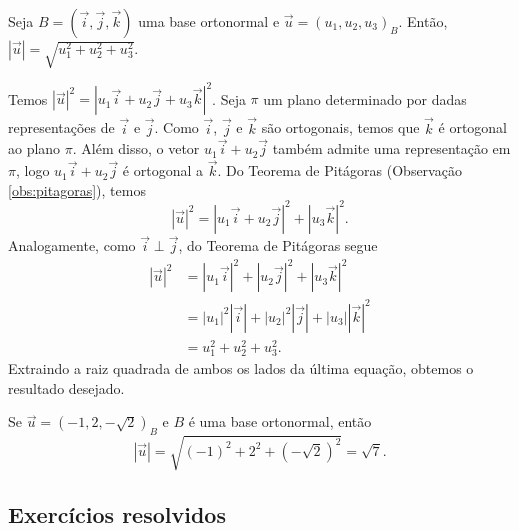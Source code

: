 \begin{prop}\label{prop:bo_norma}
  Seja $B = (\vec{i},\vec{j},\vec{k})$ uma base ortonormal e $\vec{u}=(u_1,u_2,u_3)_B$. Então, $|\vec{u}|=\sqrt{u_1^2+u_2^2+u_3^2}$.
\end{prop}
\begin{dem}
  Temos $|\vec{u}|^2 = |u_1\vec{i}+u_2\vec{j}+u_3\vec{k}|^2$. Seja $\pi$ um plano determinado por dadas representações de $\vec{i}$ e $\vec{j}$. Como $\vec{i}$, $\vec{j}$ e $\vec{k}$ são ortogonais, temos que $\vec{k}$ é ortogonal ao plano $\pi$. Além disso, o vetor $u_1\vec{i}+u_2\vec{j}$ também admite uma representação em $\pi$, logo $u_1\vec{i}+u_2\vec{j}$ é ortogonal a $\vec{k}$. Do Teorema de Pitágoras (Observação \ref{obs:pitagoras}), temos
  \begin{equation}
    |\vec{u}|^2 = |u_1\vec{i}+u_2\vec{j}|^2 + |u_3\vec{k}|^2.
  \end{equation}
  Analogamente, como $\vec{i}\perp\vec{j}$, do Teorema de Pitágoras segue
  \begin{align}
    |\vec{u}|^2 &= |u_1\vec{i}|^2 + |u_2\vec{j}|^2 + |u_3\vec{k}|^2\\
                &= |u_1|^2|\vec{i}| + |u_2|^2|\vec{j}| + |u_3||\vec{k}|^2\\
                &= u_1^2 + u_2^2 + u_3^2.
  \end{align}
  Extraindo a raiz quadrada de ambos os lados da última equação, obtemos o resultado desejado.
\end{dem}

\begin{ex}
  Se $\vec{u} = (-1,2,-\sqrt{2})_B$ e $B$ é uma base ortonormal, então
  \begin{equation}
    |\vec{u}| = \sqrt{(-1)^2 + 2^2 + (-\sqrt{2})^2} = \sqrt{7}.
  \end{equation}
\end{ex}

\subsection*{Exercícios resolvidos}

